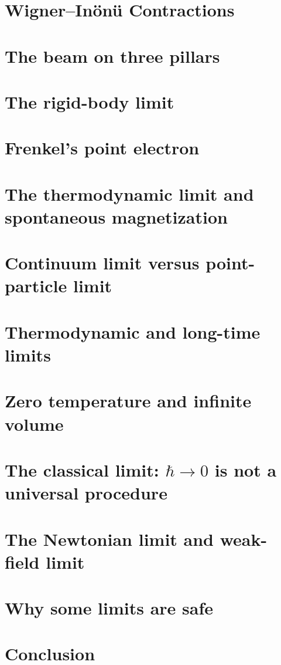 \section{Wigner--In\"on\"u Contractions}
\label{lm:wig}
\section{ The beam on three pillars}
\label{lm:bm3}
\section{ The rigid-body limit}
\label{lm:rb}
\section{Frenkel's point electron}
\label{lm:fr}
\section{The thermodynamic limit and spontaneous magnetization}
\label{lm:td}
\section{Continuum limit versus point-particle limit}
\label{lm:cpp}
\section{Thermodynamic and long-time limits}
\label{lm:lt}
\section{Zero temperature and infinite volume}
\label{lm:zt}
\section{The classical limit: $\hbar\to 0$ is not a universal procedure}
\label{lm:h0}
\section{ The Newtonian limit and weak-field limit}
\label{lm:wf}
\section{Why some limits are safe}
\label{lm:sf}
\section{Conclusion}
\label{lm:co}

